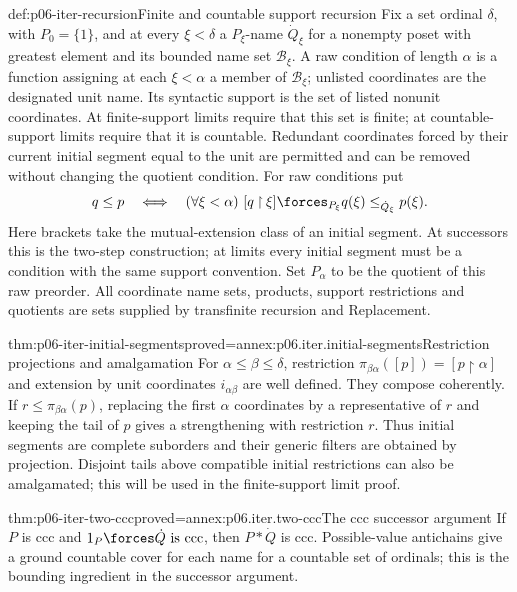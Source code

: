 \begin{hbdefinition}{def:p06-iter-recursion}{Finite and countable support recursion}
Fix a set ordinal \(\delta\), with \(P_0=\{1\}\), and at every
\(\xi<\delta\) a \(P_\xi\)-name \(\dot Q_\xi\) for a nonempty
poset with greatest element and its bounded name set \(\mathcal B_\xi\).
A raw condition of length \(\alpha\) is a function assigning at each
\(\xi<\alpha\) a member of \(\mathcal B_\xi\); unlisted coordinates
are the designated unit name. Its syntactic support is the set of
listed nonunit coordinates. At finite-support limits require that this
set is finite; at countable-support limits require that it is countable.
Redundant coordinates forced by their current initial segment equal
to the unit are permitted and can be
removed without changing the quotient condition.
For raw conditions put
\[
 q\leq p\quad\Longleftrightarrow\quad
  (\forall\xi<\alpha)\ [q\mathbin{\upharpoonright}\xi]
          \forces_{P_\xi}q(\xi)\leq_{\dot Q_\xi}p(\xi).
\]
Here brackets take the mutual-extension class of an initial segment.
At successors this is the two-step construction; at limits every
initial segment must be a condition with the same support convention.
Set \(P_\alpha\) to be the quotient of this raw preorder.
All coordinate name sets, products, support restrictions and quotients
are sets supplied by transfinite recursion and Replacement.
\end{hbdefinition}

\begin{hbtheorem}{thm:p06-iter-initial-segments}{proved=annex:p06.iter.initial-segments}{Restriction projections and amalgamation}
For \(\alpha\leq\beta\leq\delta\), restriction
\(\pi_{\beta\alpha}([p])=[p\mathbin{\upharpoonright}\alpha]\)
and extension by unit coordinates \(i_{\alpha\beta}\) are well defined.
They compose coherently. If \(r\leq\pi_{\beta\alpha}(p)\), replacing
the first \(\alpha\) coordinates by a representative of \(r\) and
keeping the tail of \(p\) gives a strengthening with restriction \(r\).
Thus initial segments are complete suborders and their generic filters
are obtained by projection. Disjoint tails above compatible initial
restrictions can also be amalgamated; this will be used in the
finite-support limit proof.
\end{hbtheorem}

\begin{hbtheorem}{thm:p06-iter-two-ccc}{proved=annex:p06.iter.two-ccc}{The ccc successor argument}
If \(P\) is ccc and \(1_P\forces\dot Q\text{ is ccc}\), then
\(P*\dot Q\) is ccc. Possible-value antichains give a ground countable
cover for each name for a countable set of ordinals; this is the
bounding ingredient in the successor argument.
\end{hbtheorem}

